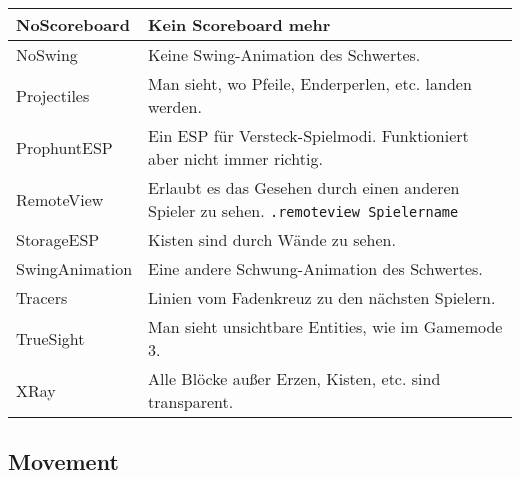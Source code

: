 \begin{longtable}{p{3cm}|p{10cm}}
\hline
NoScoreboard & Kein Scoreboard mehr \\
\hline
NoSwing & Keine Swing-Animation des Schwertes. \\
\hline
Projectiles & Man sieht, wo Pfeile, Enderperlen, etc. landen werden. \\
\hline
ProphuntESP & Ein ESP für Versteck-Spielmodi. Funktioniert aber nicht immer richtig. \\
\hline
RemoteView & Erlaubt es das Gesehen durch einen anderen Spieler zu sehen. \texttt{.remoteview Spielername} \\
\hline
\rowcolor{lime!50}StorageESP & Kisten sind durch Wände zu sehen. \\
\hline
SwingAnimation & Eine andere Schwung-Animation des Schwertes. \\
\hline
Tracers & Linien vom Fadenkreuz zu den nächsten Spielern. \\
\hline
TrueSight & Man sieht unsichtbare Entities, wie im Gamemode 3. \\
\hline
\rowcolor{lime!50}XRay & Alle Blöcke außer Erzen, Kisten, etc. sind transparent. \\
\end{longtable}

\subsection{Movement}

